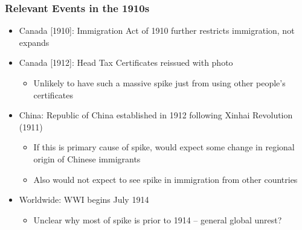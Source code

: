 \documentclass[pdf]{beamer}
\begin{document}
\begin{frame}[label = events1912]
	\frametitle{Relevant Events in the 1910s}
	\begin{itemize}
        \item Canada [1910]: Immigration Act of 1910 further restricts immigration, not expands
        \item Canada [1912]: Head Tax Certificates reissued with photo 
        \begin{itemize}
            \item Unlikely to have such a massive spike just from using other people's certificates 
        \end{itemize}
        \item China: Republic of China established in 1912 following Xinhai Revolution (1911)
        \begin{itemize}
            \item If this is primary cause of spike, would expect some change in regional origin of Chinese immigrants \hyperlink{originchi}{}
            \item Also would not expect to see spike in immigration from other countries \hyperlink{yrimmall}{}
        \end{itemize}
        \item Worldwide: WWI begins July 1914
        \begin{itemize}
            \item Unclear why most of spike is prior to 1914 -- general global unrest?
        \end{itemize}
    \end{itemize}
    \hyperlink{yrimmchi}{}
\end{frame}
\end{document}
